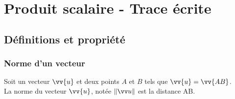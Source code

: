 \chapter{Produit scalaire - Trace écrite}
\thispagestyle{fancy}

\section{Définitions et propriété}

\subsection{Norme d'un vecteur}

    \begin{definition}
        Soit un vecteur $\vv{u}$ et deux points $A$ et $B$ tels que $\vv{u}=\vv{AB}$.\\
        La norme du vecteur $\vv{u}$, notée $\normeB{u}$ est la distance AB.	
    \end{definition}
    
